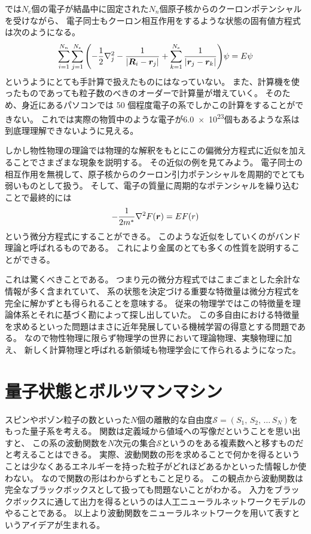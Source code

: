 \documentclass[twocolumn,10pt,dvipdfmx,a4paper]{jsarticle}
\begin{document}
では\(N_e\)個の電子が結晶中に固定された\(N_n\)個原子核からのクーロンポテンシャルを受けながら、
電子同士もクーロン相互作用をするような状態の固有値方程式は次のようになる。
\begin{align}
    \sum_{i=1}^{N_n}\sum_{j=1}^{N_e}\qty(-\frac{1}{2}\laplacian_j
    -\frac{1}{\abs{\vb*{R}_i-\vb*{r}_j}}
    +\sum_{k=1}^{N_e}\frac{1}{\abs{\vb*{r}_j-\vb*{r}_k}})\psi = E\psi
    \label{eq:no2}
\end{align}
というようにとても手計算で扱えたものにはなっていない。
また、計算機を使ったものであっても粒子数のべきのオーダーで計算量が増えていく。
そのため、身近にあるパソコンでは 50 個程度電子の系でしかこの計算をすることができない。
これでは実際の物質中のような電子が\num{6.0e23}個もあるような系は到底理理解できないように見える。

しかし物性物理の理論では物理的な解釈をもとにこの偏微分方程式に近似を加えることでさまざまな現象を説明する。
その近似の例を見てみよう。
電子同士の相互作用を無視して、原子核からのクーロン引力ポテンシャルを周期的でとても弱いものとして扱う。
そして、電子の質量に周期的なポテンシャルを繰り込むことで最終的には
\begin{equation}
    -\frac{1}{2m^*}\laplacian F(\vb*{r}) = E F(r)
\end{equation}
という微分方程式にすることができる。
このような近似をしていくのがバンド理論と呼ばれるものである。
これにより金属のとても多くの性質を説明することができる。

これは驚くべきことである。
つまり元の微分方程式ではこまごまとした余計な情報が多く含まれていて、
系の状態を決定づける重要な特徴量は微分方程式を完全に解かずとも得られることを意味する。
従来の物理学ではこの特徴量を理論体系とそれに基づく勘によって探し出していた。
この多自由における特徴量を求めるといった問題はまさに近年発展している機械学習の得意とする問題である。
なので物性物理に限らず物理学の世界において理論物理、実験物理に加え、
新しく計算物理と呼ばれる新領域も物理学会にて作られるようになった。

\section{量子状態とボルツマンマシン}
スピンやボゾン粒子の数といった\(N\)個の離散的な自由度\(\mathcal{S}=(S_1,\,S_2,\,\dots\, S_N)\)をもった量子系を考える。
関数は定義域から値域への写像だということを思い出すと、
この系の波動関数を\(N\)次元の集合\(\mathcal{S}\)というのをある複素数へと移すものだと考えることはできる。
実際、波動関数の形を求めることで何かを得るということは少なくあるエネルギーを持った粒子がどれほどあるかといった情報しか使わない。
なので関数の形はわからずともこと足りる。
この観点から波動関数は完全なブラックボックスとして扱っても問題ないことがわかる。
入力をブラックボックスに通して出力を得るというのは人工ニューラルネットワークモデルのやることである。
以上より波動関数をニューラルネットワークを用いて表すというアイデアが生まれる。
\end{document}
